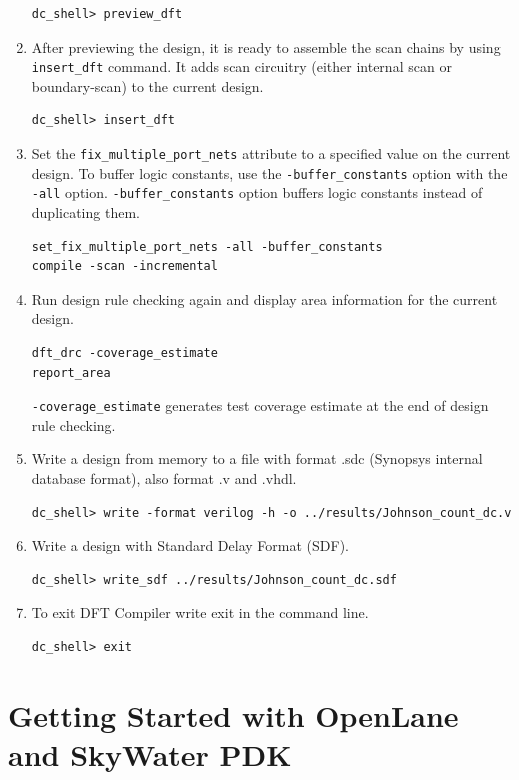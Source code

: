 \documentclass[a4paper,12pt,twoside]{article}
\begin{document}
\begin{enumerate}
\begin{verbatim}
dc_shell> preview_dft
    \end{verbatim}
    \item After previewing the design, it is ready to assemble the scan chains by using \texttt{insert\_dft} command. It adds scan circuitry (either internal scan or boundary-scan) to the current design.
    \begin{verbatim}
dc_shell> insert_dft
    \end{verbatim}
    \item Set the \texttt{fix\_multiple\_port\_nets} attribute to a specified value on the current design. To buffer logic constants, use the \texttt{-buffer\_constants} option with the \texttt{-all} option. \texttt{-buffer\_constants} option buffers logic constants instead of duplicating them.
    \begin{verbatim}
set_fix_multiple_port_nets -all -buffer_constants
compile -scan -incremental
    \end{verbatim}
    \item Run design rule checking again and display area information for the current design.
    \begin{verbatim}
dft_drc -coverage_estimate
report_area
    \end{verbatim}
    \texttt{-coverage\_estimate} generates test coverage estimate at the end of design rule checking.
    \item Write a design from memory to a file with format .sdc (Synopsys internal database format), also format .v and .vhdl.
    \begin{verbatim}
dc_shell> write -format verilog -h -o ../results/Johnson_count_dc.v
    \end{verbatim}
    \item Write a design with Standard Delay Format (SDF).
    \begin{verbatim}
dc_shell> write_sdf ../results/Johnson_count_dc.sdf
    \end{verbatim}
    \item To exit DFT Compiler write exit in the command line.
    \begin{verbatim}
dc_shell> exit
    \end{verbatim}
\end{enumerate}

\newpage
\section{Getting Started with OpenLane and SkyWater PDK}
\end{document}
